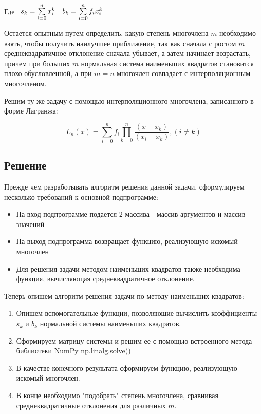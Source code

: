 Где $
\begin{array}{c c}
	s_k = \sum\limits_{i=0}^nx_i^k & b_k = \sum\limits_{i=0}^n f_ix_i^k
\end{array}
$

Остается опытным путем определить, какую степень многочлена $m$ необходимо взять, чтобы получить наилучшее приближение, так как сначала с ростом $m$ среднеквадратичное отклонение сначала убывает, а затем начинает возрастать, причем при больших $m$ нормальная система наименьших квадратов становится плохо обусловленной, а при $m = n$ многочлен совпадает с интерполяционным многочленом.

Решим ту же задачу с помощью интерполяционного многочлена, записанного в форме Лагранжа:

\[
	L_n(x) = \sum\limits_{i=0}^n f_i \prod\limits_{k=0}^n\dfrac{(x - x_k)}{(x_i - x_k)}, (i \ne k)
\]

\subsection*{Решение}

Прежде чем разработывать алгоритм решения данной задачи, сформулируем несколько требований к основной подпрограмме:

\begin{itemize}
	\item На вход подпрограмме подается 2 массива - массив аргументов и массив значений
	\item На выход подпрограмма возвращает функцию, реализующую искомый многочлен
	\item Для решения задачи методом наименьших квадратов также необходима функция, вычисляющая среднеквадратичное отклонение.
\end{itemize}

Теперь опишем алгоритм решения задачи по методу наименьших квадратов:

\begin{enumerate}
	\item Опишем вспомогательные функции, позволяющие вычислить коэффициенты $s_k$ и $b_k$ нормальной системы наименьших квадратов.
	\item Сформируем матрицу системы и решим ее с помощью встроенного метода библиотеки NumPy  np.linalg.solve()
	\item В качестве конечного результата сформируем функцию, реализующую искомый многочлен.
	\item В конце необходимо "подобрать" степень многочлена, сравнивая среднеквадратичные отклонения для различных $m$.
\end{enumerate}

